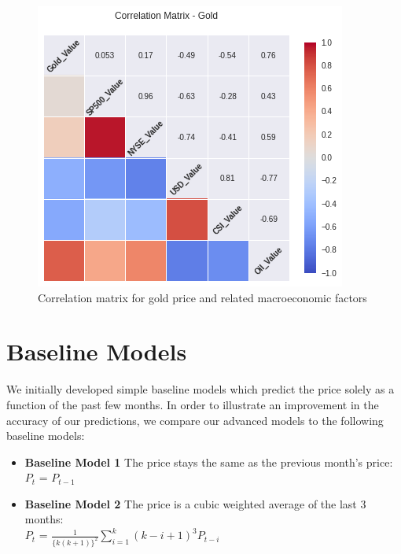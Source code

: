 \documentclass[runningheads]{llncs}
\begin{document}
\begin{figure}
\centering
\includegraphics[width=\textwidth]{Correlation_Gold_Value_.png}
\caption{Correlation matrix for gold price and related macroeconomic factors}
\label{fig:Correlation_Gold_Value_.png}
\end{figure}

\newpage

\section{Baseline Models}
We initially developed simple baseline models which predict the price solely as a function of the past few months. In order to illustrate an improvement in the accuracy of our predictions, we compare our advanced models to the following baseline models:

\begin {itemize}
\item \textbf{Baseline Model 1} The price stays the same as the previous month's price: \\
$P_{t}$ = $P_{t-1}$\\
\item \textbf{Baseline Model 2} The price is a cubic weighted average of the last 3 months: \\
$P_{t}$ = $\frac{1}{\{k(k+1)\}^2}\sum\limits_{i=1}^k (k-i+1)^3P_{t-i}$
\end {itemize}
\end{document}
